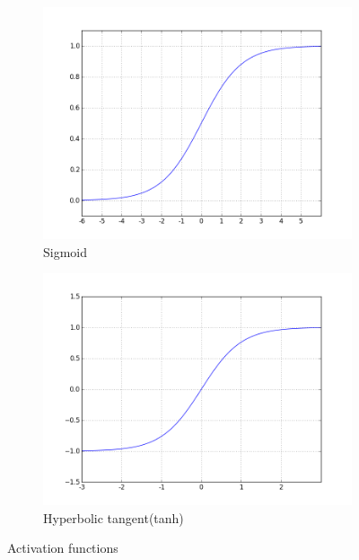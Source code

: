 \begin{figure}[H]
\centering
\begin{subfigure}{.5\textwidth}
  \centering
  \includegraphics[width=\linewidth,natwidth=898,natheight=587]{billeder/activationFunctions/sigmoid.png}
  \caption{Sigmoid}
  \label{fig:Sigmoid}
\end{subfigure}%
\begin{subfigure}{.5\textwidth}
  \centering
  \includegraphics[width=\linewidth,natwidth=898,natheight=587]{billeder/activationFunctions/tanh.png}
  \caption{Hyperbolic tangent(tanh)}
  \label{fig:Tanh}
\end{subfigure}
\caption{Activation functions}
\label{fig:test}
\end{figure}

